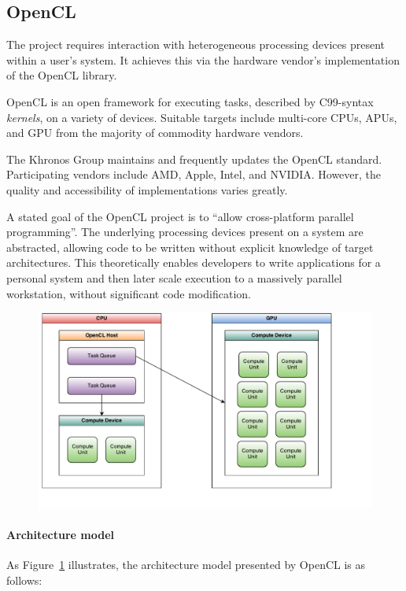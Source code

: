 \subsection{OpenCL}
The project requires interaction with heterogeneous processing devices present within a user's system.
It achieves this via the hardware vendor's implementation of the \ac{OpenCL} library.

\ac{OpenCL} is an open framework for executing tasks, described by C99-syntax \emph{kernels}, on a variety of devices.
Suitable targets include multi-core \acp{CPU}, \acp{APU}, and \ac{GPU} from the majority of commodity hardware vendors.

The Khronos Group maintains and frequently updates the \ac{OpenCL} standard\cite{khronos}.
Participating vendors include \ac{AMD}, Apple, Intel, and NVIDIA.
However, the quality and accessibility of implementations varies greatly.

A stated goal of the \ac{OpenCL} project is to ``allow cross-platform parallel programming''.
The underlying processing devices present on a system are abstracted, allowing code to be written without explicit knowledge of target architectures.
This theoretically enables developers to write applications for a personal system and then later scale execution to a massively parallel workstation, without significant code modification.

\begin{center}
\begin{figure}[h]
	\includegraphics[width=\textwidth]{./figures/OpenCLModel}
	\label{fig:ocl_model}
\end{figure}
\end{center}

\paragraph*{Architecture model}
As Figure~\ref{fig:ocl_model} illustrates, the architecture model presented by \ac{OpenCL} is as follows:

